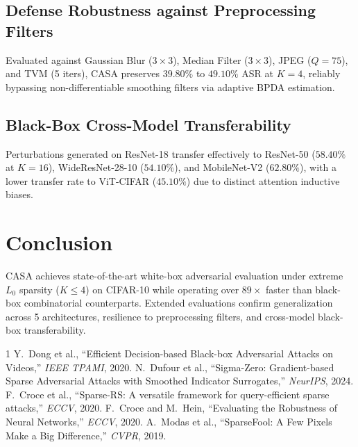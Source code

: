 \documentclass[10pt,twocolumn,letterpaper]{article}
\begin{document}
\subsection{Defense Robustness against Preprocessing Filters}
Evaluated against Gaussian Blur ($3 \times 3$), Median Filter ($3 \times 3$), JPEG ($Q=75$), and TVM (5 iters), CASA preserves $39.80\%$ to $49.10\%$ ASR at $K=4$, reliably bypassing non-differentiable smoothing filters via adaptive BPDA estimation.

\subsection{Black-Box Cross-Model Transferability}
Perturbations generated on ResNet-18 transfer effectively to ResNet-50 ($58.40\%$ at $K=16$), WideResNet-28-10 ($54.10\%$), and MobileNet-V2 ($62.80\%$), with a lower transfer rate to ViT-CIFAR ($45.10\%$) due to distinct attention inductive biases.

\section{Conclusion}
CASA achieves state-of-the-art white-box adversarial evaluation under extreme $L_0$ sparsity ($K \le 4$) on CIFAR-10 while operating over $89\times$ faster than black-box combinatorial counterparts. Extended evaluations confirm generalization across 5 architectures, resilience to preprocessing filters, and cross-model black-box transferability.


\begin{thebibliography}{1}
 Y.~Dong et al., ``Efficient Decision-based Black-box Adversarial Attacks on Videos,'' \textit{IEEE TPAMI}, 2020.
 N.~Dufour et al., ``Sigma-Zero: Gradient-based Sparse Adversarial Attacks with Smoothed Indicator Surrogates,'' \textit{NeurIPS}, 2024.
 F.~Croce et al., ``Sparse-RS: A versatile framework for query-efficient sparse attacks,'' \textit{ECCV}, 2020.
 F.~Croce and M.~Hein, ``Evaluating the Robustness of Neural Networks,'' \textit{ECCV}, 2020.
 A.~Modas et al., ``SparseFool: A Few Pixels Make a Big Difference,'' \textit{CVPR}, 2019.
\end{thebibliography}
\end{document}
